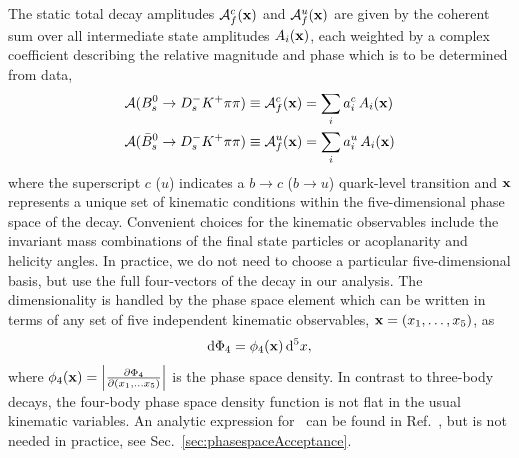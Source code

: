 The static total decay amplitudes  $\mathcal A^c_{f}(\mathbf{x})$  and $ \mathcal A^u_{f}(\mathbf{x})$ 
are given by the coherent sum over all intermediate state amplitudes $A_i(\mathbf{x})$, each weighted by a complex coefficient
describing the relative magnitude and phase
which is to be determined from data,
 \begin{align}
 \mathcal A(B_s^0 \rightarrow D_s^{-} K^{+} \pi\pi) &\equiv \mathcal{A}^c_f(\mathbf{x}) = \sum_i a^c_i \, A_i(\mathbf{x})   \\
 \mathcal A(\bar B_s^0 \rightarrow D_s^{-} K^{+} \pi\pi) &\equiv \mathcal A^u_f(\mathbf{x})  =  \sum_i  a^u_i \, A_i(\mathbf{x})   
 \end{align}
where the superscript $c$ ($u$) indicates a $b \to c$ ($b\to u$) quark-level transition  
and $\mathbf{x}$ 
represents a unique set of kinematic conditions within the five-dimensional phase space of the decay.
Convenient choices for the kinematic observables
include the invariant mass combinations of the final state particles %
or acoplanarity and helicity angles. %
In practice, we do not need to choose a particular five-dimensional
basis, but use the full four-vectors of the decay in our
analysis. 
The dimensionality is handled by the phase space element which can be written in terms of any set of five independent kinematic observables, $\mathbf{x} = (x_1, \ldots, x_5)$, as
\begin{equation}
	\mathrm{d}\Phi_4 = \phi_4(\mathbf{x}) \, \mathrm{d}^5x ,
\end{equation}
where $\phi_{4}(\mathbf{x} ) = \left\vert  \frac{\partial \Phi_4}{\partial(x_1, \ldots x_5)} \right\vert$ is the phase space density.
In contrast to three-body decays, the four-body phase space density
function is not flat in the usual kinematic variables.  
An analytic expression for \phsd\ can be found
in Ref.~\cite{kinematics}, but is not needed in practice, see Sec.~\ref{sec:phasespaceAcceptance}.

